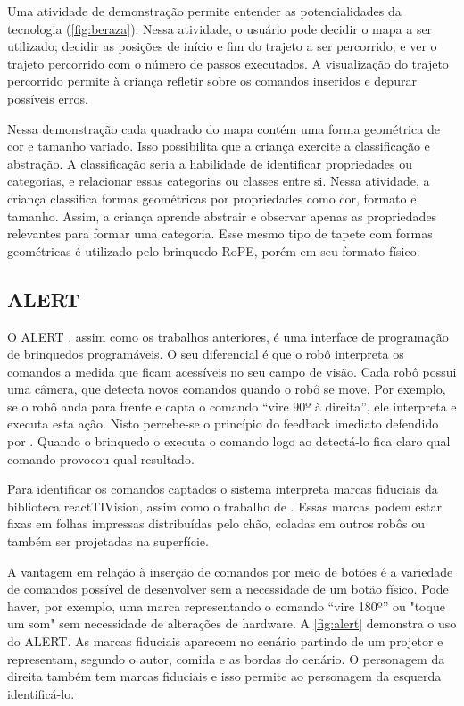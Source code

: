 Uma atividade de demonstração permite entender as potencialidades da tecnologia (\autoref{fig:beraza}). Nessa atividade, o usuário pode decidir o mapa a ser utilizado; decidir as posições de início e fim do trajeto a ser percorrido; e ver o trajeto percorrido com o número de passos executados. A visualização do trajeto percorrido permite à criança refletir sobre os comandos inseridos e depurar possíveis erros.

Nessa demonstração cada quadrado do mapa contém uma forma geométrica de cor e tamanho variado. Isso possibilita que a criança exercite a classificação e abstração. A classificação seria a habilidade de identificar propriedades ou categorias, e relacionar essas categorias ou classes entre si. Nessa atividade, a criança classifica formas geométricas por propriedades como cor, formato e tamanho. Assim, a criança aprende abstrair e observar apenas as propriedades relevantes para formar uma categoria. Esse mesmo tipo de tapete com formas geométricas é utilizado pelo brinquedo RoPE, porém em seu formato físico.

\subsection{ALERT}

O ALERT \cite{burleson_active_2018}, assim como os trabalhos anteriores, é uma interface de programação de brinquedos programáveis. O seu diferencial é que o robô interpreta os comandos a medida que ficam acessíveis no seu campo de visão. Cada robô possui uma câmera, que detecta novos comandos quando o robô se move. Por exemplo, se o robô anda para frente e capta o comando “vire 90º à direita”, ele interpreta e executa esta ação. Nisto percebe-se o princípio do feedback imediato defendido por . Quando o brinquedo o executa o comando logo ao detectá-lo fica claro qual comando provocou qual resultado.

Para identificar os comandos captados o sistema interpreta marcas fiduciais da biblioteca reactTIVision, assim como o trabalho de . Essas marcas podem estar fixas em folhas impressas distribuídas pelo chão, coladas em outros robôs ou também ser projetadas na superfície.

A vantagem em relação à inserção de comandos por meio de botões é a variedade de comandos possível de desenvolver sem a necessidade de um botão físico. Pode haver, por exemplo, uma marca representando o comando “vire 180º” ou "toque um som" sem necessidade de alterações de hardware. A \autoref{fig:alert} demonstra o uso do ALERT. As marcas fiduciais aparecem no cenário partindo de um projetor e representam, segundo o autor, comida e as bordas do cenário. O personagem da direita também tem marcas fiduciais e isso permite ao personagem da esquerda identificá-lo.

